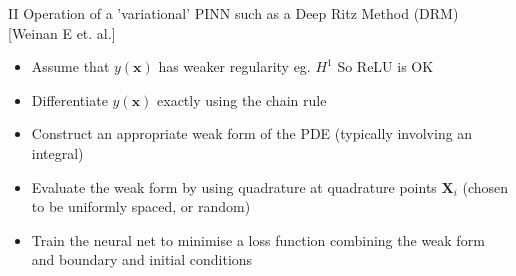 \documentclass{beamer}
\begin{document}


    





\begin{frame} {II Operation of a 'variational' PINN such as a Deep Ritz Method (DRM)  [Weinan E et. al.]}

\begin{itemize}
    \item Assume that $y({\mathbf x})$ has weaker regularity eg. $H^1$ {\color{red} So ReLU is OK}
\item Differentiate $y({\mathbf x})$ {\color{blue} exactly} using the chain rule
\item Construct an appropriate {\color{red} weak form of the PDE} (typically involving an integral)

\item Evaluate the weak form by using quadrature at {\color{blue} quadrature points} ${\mathbf X}_i$ (chosen to be uniformly spaced, or random)
\item Train the neural net to minimise a loss function combining the weak form and boundary and initial conditions

\end{itemize}

\end{frame}
\end{document}
